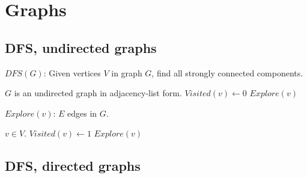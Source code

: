 \documentclass{article}
\begin{document}
	
\listofalgorithms
\section{Graphs}
\subsection{DFS, undirected graphs}

\begin{algorithm}
\caption{$DFS(G)$: Given vertices $V$ in graph $G$, find all strongly connected components.}
\begin{algorithmic}[1]
\REQUIRE $G$ is an undirected graph in adjacency-list form.
\STATE $Visited(v) \gets 0$
\ENDFOR
{}
	\STATE $Explore(v)$
\ENDIF
\ENDFOR
\end{algorithmic}
\end{algorithm}

\begin{algorithm}
\caption{$Explore(v)$: $E$ edges in $G$.}
\begin{algorithmic}[1]
\REQUIRE $v \in V$.
\STATE $Visited(v) \gets 1$
	\STATE $Explore(v)$
\ENDIF
\ENDFOR
\end{algorithmic}
\end{algorithm}

\subsection{DFS, directed graphs}
\end{document}
